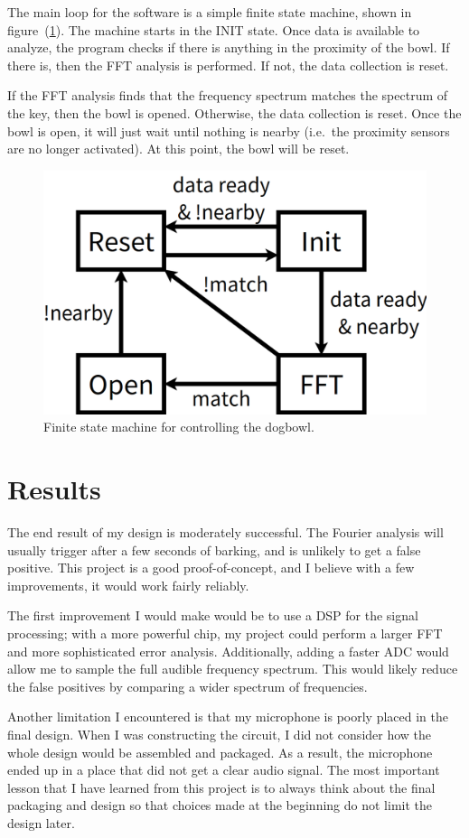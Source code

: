 \documentclass[11pt]{article}           %
\begin{document}
The main loop for the software is a simple finite state machine, shown in
figure~(\ref{fig:fsm}). The machine starts in the INIT state. Once data is
available to analyze, the program checks if there is anything in the proximity
of the bowl. If there is, then the FFT analysis is performed. If not, the data
collection is reset.

If the FFT analysis finds that the frequency spectrum matches the spectrum of
the key, then the bowl is opened. Otherwise, the data collection is reset. Once
the bowl is open, it will just wait until nothing is nearby (i.e.\ the proximity
sensors are no longer activated). At this point, the bowl will be reset.

\begin{figure}[h]
    \centering
    \includegraphics[width=0.4\linewidth]{sch/fsm.png}
    \caption{Finite state machine for controlling the dogbowl.}
\label{fig:fsm}
\end{figure}

\section{Results}
\label{sec:results}

The end result of my design is moderately successful. The Fourier analysis will
usually trigger after a few seconds of barking, and is unlikely to get a false
positive. This project is a good proof-of-concept, and I believe with a few
improvements, it would work fairly reliably.

The first improvement I would make would be to use a DSP for the signal
processing; with a more powerful chip, my project could perform a larger FFT and
more sophisticated error analysis. Additionally, adding a faster ADC would allow
me to sample the full audible frequency spectrum. This would likely reduce the
false positives by comparing a wider spectrum of frequencies.

Another limitation I encountered is that my microphone is poorly placed in the
final design. When I was constructing the circuit, I did not consider how the
whole design would be assembled and packaged. As a result, the microphone ended
up in a place that did not get a clear audio signal. The most important lesson
that I have learned from this project is to always think about the final
packaging and design so that choices made at the beginning do not limit the
design later.
\end{document}
